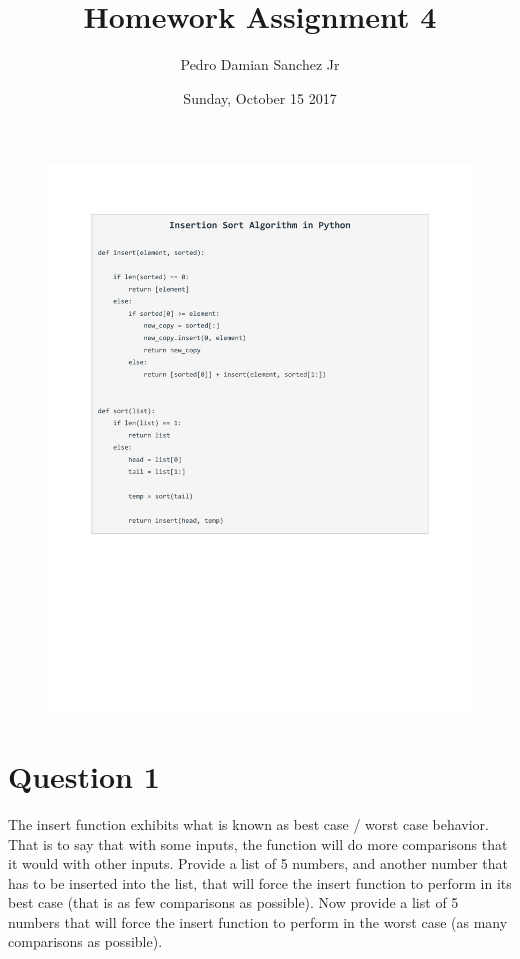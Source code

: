 \documentclass[11pt]{article}
\title{\bf Homework Assignment 4}
\date{Sunday, October 15 2017}
\author{ Pedro Damian Sanchez Jr}
\begin{document}
\maketitle

\begin{figure}
\begin{center}
\includegraphics[scale = 0.5]{code.pdf}
\end{center}
\end{figure}

\section{Question 1}

The insert function exhibits what is known as best case / worst case behavior. That is to say that with some inputs, the function will do more comparisons that it would with other inputs. Provide a list of 5 numbers, and another number that has to be inserted into the list, that will force the insert function to perform in its best case (that is as few comparisons as possible). Now provide a list of 5 numbers that will force the insert function to perform in the worst case (as many comparisons as possible).
\end{document}
